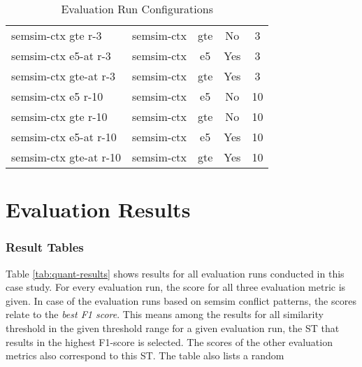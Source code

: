 \documentclass[11pt]{scrreprt}
\begin{document}
\begin{table}
\begin{tabular}{llccc}
semsim-ctx gte r-3               & semsim-ctx                   & gte                        & No                                        & 3 \\
semsim-ctx e5-at r-3             & semsim-ctx                   & e5                         & Yes                                       & 3 \\
semsim-ctx gte-at r-3            & semsim-ctx                   & gte                        & Yes                                       & 3 \\
semsim-ctx e5 r-10               & semsim-ctx                   & e5                         & No                                        & 10 \\
semsim-ctx gte r-10              & semsim-ctx                   & gte                        & No                                        & 10 \\
semsim-ctx e5-at r-10            & semsim-ctx                   & e5                         & Yes                                       & 10 \\
semsim-ctx gte-at r-10           & semsim-ctx                   & gte                        & Yes                                       & 10 \\
\bottomrule
\end{tabular}
\caption{Evaluation Run Configurations}
\label{tab:evaluation-run-configs}
\end{table}



\section{Evaluation Results}

\subsubsection{Result Tables}
Table \cref{tab:quant-results} shows results for all evaluation runs conducted in this case study. For every evaluation run, the score for all three evaluation metric is given. In case of the evaluation runs based on semsim conflict patterns, the scores relate to the \textit{best F1 score}. This means among the results for all similarity threshold in the given threshold range for a given evaluation run, the ST that results in the highest F1-score is selected. The scores of the other evaluation metrics also correspond to this ST. The table also lists a random 
\end{document}
